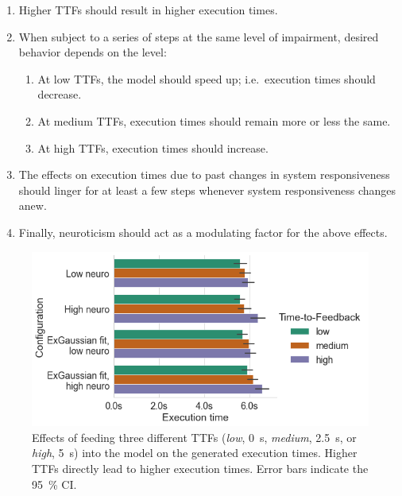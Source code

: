 \begin{enumerate}
    \item\label{it:ttftoexectime} Higher \glspl{TTF} should result in higher execution times.
    \item\label{it:duration} When subject to a series of steps at the same level of impairment, desired behavior depends on the level:
    \begin{enumerate}
        \item At low \glspl{TTF}, the model should speed up; i.e.\ execution times should decrease.
        \item At medium \glspl{TTF}, execution times should remain more or less the same.
        \item At high \glspl{TTF}, execution times should increase.
    \end{enumerate}
    \item The effects on execution times due to past changes in system responsiveness should linger for at least a few steps whenever system responsiveness changes anew.
    \item\label{it:neuro} Finally, neuroticism should act as a modulating factor for the above effects.
\end{enumerate}

\begin{figure}
    \centering
    \includegraphics[width=\textwidth]{figs/new_model/ttf_to_exectime}
    \caption{%
        Effects of feeding three different \glspl{TTF} (\emph{low}, \SI{0}{\second}, \emph{medium}, \SI{2.5}{\second}, or \emph{high}, \SI{5}{\second}) into the model on the generated execution times.
        Higher \glspl{TTF} directly lead to higher execution times.
        Error bars indicate the \SI{95}{\percent} \gls{CI}.
    }\label{fig:ttf_to_exectime}
\end{figure}

